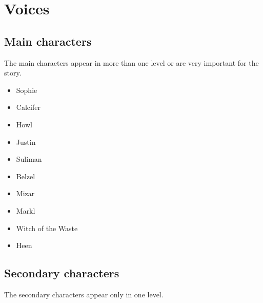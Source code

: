 \section{Voices}

\subsection{Main characters}
The main characters appear in more than one level or are very important for the story.
\begin{itemize}
	\item Sophie
	\item Calcifer
	\item Howl
	\item Justin
	\item Suliman
	\item Belzel
	\item Mizar
	\item Markl
	\item Witch of the Waste
	\item Heen
\end{itemize}

\subsection{Secondary characters}
The secondary characters appear only in one level.


